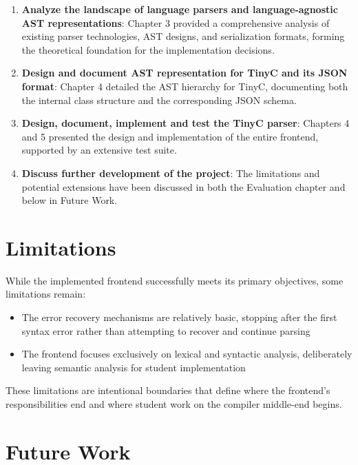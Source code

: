 \begin{enumerate}
    \item \textbf{Analyze the landscape of language parsers and language-agnostic AST representations}: Chapter 3 provided a comprehensive analysis of existing parser technologies, AST designs, and serialization formats, forming the theoretical foundation for the implementation decisions.
    
    \item \textbf{Design and document AST representation for TinyC and its JSON format}: Chapter 4 detailed the AST hierarchy for TinyC, documenting both the internal class structure and the corresponding JSON schema.
    
    \item \textbf{Design, document, implement and test the TinyC parser}: Chapters 4 and 5 presented the design and implementation of the entire frontend, supported by an extensive test suite.
    
    \item \textbf{Discuss further development of the project}: The limitations and potential extensions have been discussed in both the Evaluation chapter and below in Future Work.
\end{enumerate}

\section{Limitations}

While the implemented frontend successfully meets its primary objectives, some limitations remain:

\begin{itemize}
    \item The error recovery mechanisms are relatively basic, stopping after the first syntax error rather than attempting to recover and continue parsing
    \item The frontend focuses exclusively on lexical and syntactic analysis, deliberately leaving semantic analysis for student implementation
\end{itemize}

These limitations are intentional boundaries that define where the frontend's responsibilities end and where student work on the compiler middle-end begins.

\section{Future Work}

